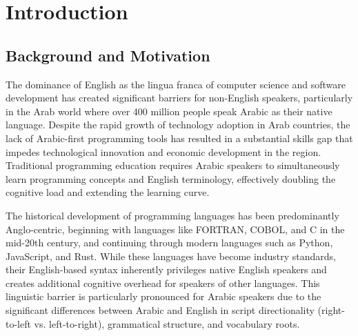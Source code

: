 \documentclass[11pt,a4paper]{article}
\begin{document}
\begin{abstract}
\vspace{0.3cm}
\noindent\textbf{Keywords:} Arabic Programming Language, Natural Language Programming, JIT Compiler, ONNX, AI-Assisted Development, Vibe Coding, RTL Programming, Localization

\noindent\textbf{\<al-kalimat al-miftahiyyah>:} \<lughat barmajah 'arabiyyah, barmajah bi-l-lughah al-tab'iyyah, mujamma' fawri, ONNX, taTwiyr mus'aad bi-l-dhaka' al-istina'i, al-barmajah al-daTiyyah, barmajah RTL, ta'rib>
\end{abstract}

\newpage
\tableofcontents
\newpage

\section{Introduction}

\subsection{Background and Motivation}

The dominance of English as the lingua franca of computer science and software development has created significant barriers for non-English speakers, particularly in the Arab world where over 400 million people speak Arabic as their native language. Despite the rapid growth of technology adoption in Arab countries, the lack of Arabic-first programming tools has resulted in a substantial skills gap that impedes technological innovation and economic development in the region. Traditional programming education requires Arabic speakers to simultaneously learn programming concepts and English terminology, effectively doubling the cognitive load and extending the learning curve.

The historical development of programming languages has been predominantly Anglo-centric, beginning with languages like FORTRAN, COBOL, and C in the mid-20th century, and continuing through modern languages such as Python, JavaScript, and Rust. While these languages have become industry standards, their English-based syntax inherently privileges native English speakers and creates additional cognitive overhead for speakers of other languages. This linguistic barrier is particularly pronounced for Arabic speakers due to the significant differences between Arabic and English in script directionality (right-to-left vs. left-to-right), grammatical structure, and vocabulary roots.
\end{document}
